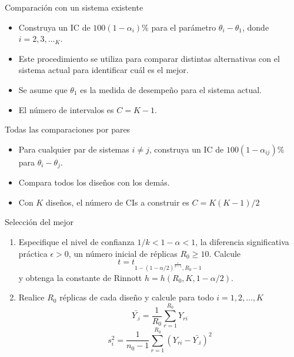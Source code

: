 \begin{frame}{Comparación con un sistema existente}
	\begin{itemize}
		\item Construya un IC de $100(1-\alpha_i)\%$ para el parámetro $\theta_i-\theta_1$, donde $i=2,3,\dots_K$.
		\item Este procedimiento se utiliza para comparar distintas alternativas con el sistema actual para identificar cuál es el mejor.
		\item Se asume que $\theta_1$ es la medida de desempeño para el sistema actual.
		\item El número de intervalos es $C=K-1$.
	\end{itemize}
\end{frame}

\begin{frame}{Todas las comparaciones por pares}
	\begin{itemize}
		\item Para cualquier par de sistemas $i\neq j$, construya un IC de $100(1-\alpha_{ij})\%$ para $\theta_i-\theta_j$.
		\item Compara todos los diseños con los demás.
		\item Con $K$ diseños, el número de CIs a construir es $C=K(K-1)/2$
	\end{itemize}
\end{frame}

\begin{frame}{Selección del mejor}
\begin{enumerate}
	\item Especifique el nivel de confianza $1/k < 1-\alpha < 1$, la diferencia significativa práctica $\epsilon > 0$, un número inicial de réplicas $R_0 \geq 10$. Calcule 
	\[t=t_{1-\left(1-\alpha/2\right)^{\frac{1}{k-1}},R_0-1}\]
	y obtenga la constante de Rinnott $h=h\left(R_0,K,1-\alpha/2\right)$.
	
	\item Realice $R_0$ réplicas de cada diseño y calcule para todo $i=1,2,\dots,K$
	\[\bar{Y_{.i}}=\frac{1}{R_0}\sum_{r=1}^{R_0}{Y_{ri}}\]
	\[s_{i}^{2}=\frac{1}{n_0-1}\sum_{r=1}^{R_0}{\left(Y_{ri}-\bar{Y_{.i}}\right)^2}\]
\end{enumerate}
\end{frame}

